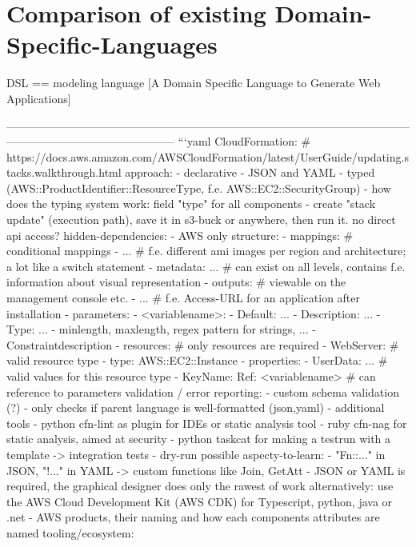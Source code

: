 \section{Comparison of existing Domain-Specific-Languages}
DSL == modeling language [A Domain Specific Language to Generate Web Applications]

---------------------------------------------------------------------------------------------------------------------------------------------------------
```yaml
CloudFormation: # https://docs.aws.amazon.com/AWSCloudFormation/latest/UserGuide/updating.stacks.walkthrough.html
  approach:
    - declarative
    - JSON and YAML
    - typed (AWS::ProductIdentifier::ResourceType, f.e. AWS::EC2::SecurityGroup) - how does the typing system work: field "type" for all components
    - create "stack update" (execution path), save it in s3-buck or anywhere, then run it. no direct api access?
  hidden-dependencies:
    - AWS only
  structure:
    - mappings: # conditional mappings
      - ... # f.e. different ami images per region and architecture; a lot like a switch statement
    - metadata: ... # can exist on all levels, contains f.e. information about visual representation
    - outputs: # viewable on the management console etc.
      - ... # f.e. Access-URL for an application after installation
    - parameters:
      - <variablename>:
        - Default: ...
        - Description: ...
        - Type: ...
        - minlength, maxlength, regex pattern for strings, ...
        - Constraintdescription
    - resources: # only resources are required
      - WebServer: # valid resource type
        - type: AWS::EC2::Instance
        - properties:
          - UserData: ... # valid values for this resource type
          - KeyName:
            Ref: <variablename> # can reference to parameters
  validation / error reporting:
    - custom schema validation (?)
    - only checks if parent language is well-formatted (json,yaml)
    - additional tools
      - python cfn-lint as plugin for IDEs or static analysis tool
      - ruby cfn-nag for static analysis, aimed at security
      - python taskcat for making a testrun with a template -> integration tests
    - dry-run possible
  aspecty-to-learn:
    - "Fn::..." in JSON, "!..." in YAML -> custom functions like Join, GetAtt
    - JSON or YAML is required, the graphical designer does only the rawest of work
      alternatively: use the AWS Cloud Development Kit (AWS CDK) for Typescript, python, java or .net
    - AWS products, their naming and how each components attributes are named
  tooling/ecosystem:
